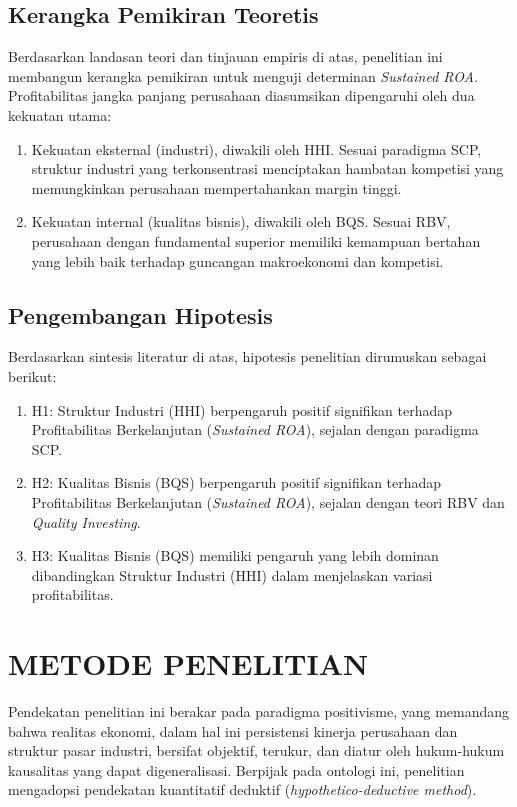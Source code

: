 \documentclass[12pt,a4paper]{report}
\begin{document}
\section{Kerangka Pemikiran Teoretis}

Berdasarkan landasan teori dan tinjauan empiris di atas, penelitian ini membangun kerangka pemikiran untuk menguji determinan \textit{Sustained ROA}. Profitabilitas jangka panjang perusahaan diasumsikan dipengaruhi oleh dua kekuatan utama:

\begin{enumerate}
    \item Kekuatan eksternal (industri), diwakili oleh HHI. Sesuai paradigma SCP, struktur industri yang terkonsentrasi menciptakan hambatan kompetisi yang memungkinkan perusahaan mempertahankan margin tinggi.
    \item Kekuatan internal (kualitas bisnis), diwakili oleh BQS. Sesuai RBV, perusahaan dengan fundamental superior memiliki kemampuan bertahan yang lebih baik terhadap guncangan makroekonomi dan kompetisi.
\end{enumerate}

\section{Pengembangan Hipotesis}

Berdasarkan sintesis literatur di atas, hipotesis penelitian dirumuskan sebagai berikut:

\begin{enumerate}
    \item H1: Struktur Industri (HHI) berpengaruh positif signifikan terhadap Profitabilitas Berkelanjutan (\textit{Sustained ROA}), sejalan dengan paradigma SCP.
    \item H2: Kualitas Bisnis (BQS) berpengaruh positif signifikan terhadap Profitabilitas Berkelanjutan (\textit{Sustained ROA}), sejalan dengan teori RBV dan \textit{Quality Investing}.
    \item H3: Kualitas Bisnis (BQS) memiliki pengaruh yang lebih dominan dibandingkan Struktur Industri (HHI) dalam menjelaskan variasi profitabilitas.
\end{enumerate}

\chapter{METODE PENELITIAN}

Pendekatan penelitian ini berakar pada paradigma positivisme, yang memandang bahwa realitas ekonomi, dalam hal ini persistensi kinerja perusahaan dan struktur pasar industri, bersifat objektif, terukur, dan diatur oleh hukum-hukum kausalitas yang dapat digeneralisasi. Berpijak pada ontologi ini, penelitian mengadopsi pendekatan kuantitatif deduktif (\textit{hypothetico-deductive method}).
\end{document}
